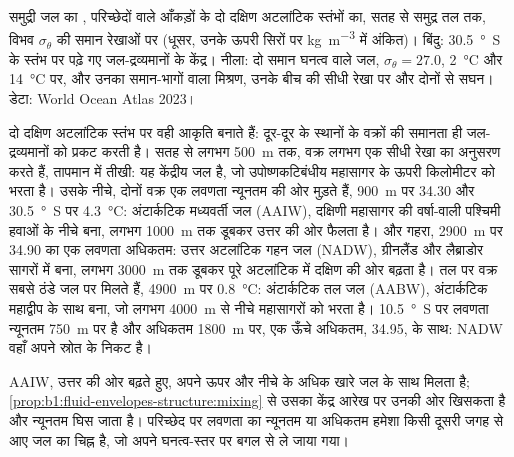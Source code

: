 \begin{omfigure}
{\small समुद्री जल का , परिच्छेदों वाले आँकड़ों के दो दक्षिण अटलांटिक स्तंभों का, सतह से समुद्र तल तक, विभव  $\sigma_\theta$ की समान रेखाओं पर (धूसर, उनके ऊपरी सिरों पर \si{kg.m^{-3}} में अंकित)। बिंदु: \qty{30.5}{\degree S} के स्तंभ पर पढ़े गए जल-द्रव्यमानों के केंद्र। नीला: दो समान घनत्व वाले जल, $\sigma_\theta = 27.0$, \qty{2}{\celsius} और \qty{14}{\celsius} पर, और उनका समान-भागों वाला मिश्रण, उनके बीच की सीधी रेखा पर और दोनों से सघन। डेटा: World Ocean Atlas 2023।}
\label{fig:b1:fluid-envelopes-structure:ts}
\end{omfigure}

दो दक्षिण अटलांटिक स्तंभ  पर वही आकृति बनाते हैं: दूर-दूर के स्थानों के वक्रों की समानता ही जल-द्रव्यमानों को प्रकट करती है। सतह से लगभग \qty{500}{m} तक, वक्र लगभग एक सीधी रेखा का अनुसरण करते हैं, तापमान में तीखी: यह केंद्रीय जल है, जो उपोष्णकटिबंधीय महासागर के ऊपरी किलोमीटर को भरता है। उसके नीचे, दोनों वक्र एक लवणता न्यूनतम की ओर मुड़ते हैं, \qty{900}{m} पर \num{34.30} और \qty{30.5}{\degree S} पर \qty{4.3}{\celsius}: अंटार्कटिक मध्यवर्ती जल (AAIW), दक्षिणी महासागर की वर्षा-वाली पश्चिमी हवाओं के नीचे बना, लगभग \qty{1000}{m} तक डूबकर उत्तर की ओर फैलता है। और गहरा, \qty{2900}{m} पर \num{34.90} का एक लवणता अधिकतम: उत्तर अटलांटिक गहन जल (NADW), ग्रीनलैंड और लैब्राडोर सागरों में बना, लगभग \qty{3000}{m} तक डूबकर पूरे अटलांटिक में दक्षिण की ओर बढ़ता है। तल पर वक्र सबसे ठंडे जल पर मिलते हैं, \qty{4900}{m} पर \qty{0.8}{\celsius}: अंटार्कटिक तल जल (AABW), अंटार्कटिक महाद्वीप के साथ बना, जो लगभग \qty{4000}{m} से नीचे महासागरों को भरता है। \qty{10.5}{\degree S} पर लवणता न्यूनतम \qty{750}{m} पर है और अधिकतम \qty{1800}{m} पर, एक ऊँचे अधिकतम, \num{34.95}, के साथ: NADW वहाँ अपने स्रोत के निकट है।

AAIW, उत्तर की ओर बढ़ते हुए, अपने ऊपर और नीचे के अधिक खारे जल के साथ मिलता है; \cref{prop:b1:fluid-envelopes-structure:mixing} से उसका केंद्र आरेख पर उनकी ओर खिसकता है और न्यूनतम घिस जाता है। परिच्छेद पर लवणता का न्यूनतम या अधिकतम हमेशा किसी दूसरी जगह से आए जल का चिह्न है, जो अपने घनत्व-स्तर पर बगल से ले जाया गया।

